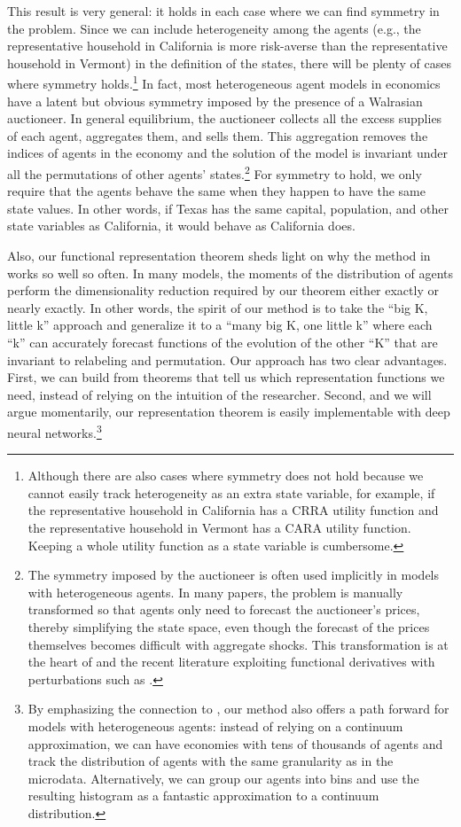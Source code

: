 \documentclass[12pt]{article}
\begin{document}
This result is very general: it holds in each case where we can find symmetry in the problem. Since we can include heterogeneity among the agents (e.g., the representative household in California is more risk-averse than the representative household in Vermont) in the definition of the states, there will be plenty of cases where symmetry holds.\footnote{Although there are also cases where symmetry does not hold because we cannot easily track heterogeneity as an extra state variable, for example, if the representative household in California has a CRRA utility function and the representative household in Vermont has a CARA utility function. Keeping a whole utility function as a state variable is cumbersome.} In fact, most heterogeneous agent models in economics have a latent but obvious symmetry imposed by the presence of a Walrasian auctioneer. In general equilibrium, the auctioneer collects all the excess supplies of each agent, aggregates them, and sells them. This aggregation removes the indices of agents in the economy and the solution of the model is invariant under all the permutations of other agents' states.\footnote{The symmetry imposed by the auctioneer is often used implicitly in models with heterogeneous agents. In many papers, the problem is manually transformed so that agents only need to forecast the auctioneer's prices, thereby simplifying the state space, even though the forecast of the prices themselves becomes difficult with aggregate shocks. This transformation is at the heart of \citet{krusell1998income} and the recent literature exploiting functional derivatives with perturbations such as \citet{Bilal2021}.} For symmetry to hold, we only require that the agents behave the same when they happen to have the same state values. In other words, if Texas has the same capital, population, and other state variables as California, it would behave as California does. 

Also, our functional representation theorem sheds light on why the method in \citet{krusell1998income} works so well so often. In many models, the moments of the distribution of agents perform the dimensionality reduction required by our theorem either exactly or nearly exactly. In other words, the spirit of our method is to take the ``big K, little k'' approach and generalize it to a ``many big K, one little k'' where each ``k'' can accurately forecast functions of the evolution of the other ``K'' that are invariant to relabeling and permutation. Our approach has two clear advantages. First, we can build from theorems that tell us which representation functions we need, instead of relying on the intuition of the researcher. Second, and we will argue momentarily, our representation theorem is easily implementable with deep neural networks.\footnote{By emphasizing the connection to \citet{krusell1998income}, our method also offers a path forward for models with heterogeneous agents: instead of relying on a continuum approximation, we can have economies with tens of thousands of agents and track the distribution of agents with the same granularity as in the microdata. Alternatively, we can group our agents into bins and use the resulting histogram as a fantastic approximation to a continuum distribution.}
\end{document}

